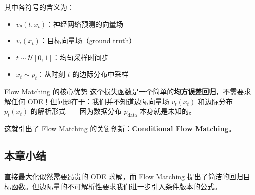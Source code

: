 其中各符号的含义为：
\begin{itemize}
    \item $v_\theta(t, x_t)$：神经网络预测的向量场
    \item $v_t(x_t)$：目标向量场（ground truth）
    \item $t \sim \mathcal{U}[0,1]$：均匀采样时间步
    \item $x_t \sim p_t$：从时刻 $t$ 的边际分布中采样
\end{itemize}

\begin{importantbox}{Flow Matching 的核心优势}
这个损失函数是一个简单的\textbf{均方误差回归}，不需要求解任何 ODE！但问题在于：我们并不知道边际向量场 $v_t(x_t)$ 和边际分布 $p_t(x_t)$ 的解析形式——因为数据分布 $p_{\text{data}}$ 本身就是未知的。

这就引出了 Flow Matching 的关键创新：\textbf{Conditional Flow Matching}。
\end{importantbox}

\subsection{本章小结}

直接最大化似然需要昂贵的 ODE 求解，而 Flow Matching 提出了简洁的回归目标函数。但边际量的不可解析性要求我们进一步引入条件版本的公式。


